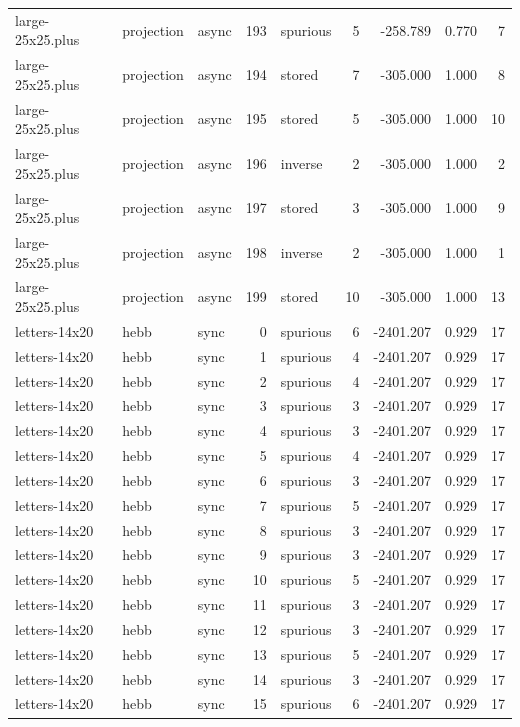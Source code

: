 \begin{tabular}{lllrlrrrr}
large-25x25.plus & projection & async & 193 & spurious & 5 & -258.789 & 0.770 & 7 \\
large-25x25.plus & projection & async & 194 & stored & 7 & -305.000 & 1.000 & 8 \\
large-25x25.plus & projection & async & 195 & stored & 5 & -305.000 & 1.000 & 10 \\
large-25x25.plus & projection & async & 196 & inverse & 2 & -305.000 & 1.000 & 2 \\
large-25x25.plus & projection & async & 197 & stored & 3 & -305.000 & 1.000 & 9 \\
large-25x25.plus & projection & async & 198 & inverse & 2 & -305.000 & 1.000 & 1 \\
large-25x25.plus & projection & async & 199 & stored & 10 & -305.000 & 1.000 & 13 \\
letters-14x20 & hebb & sync & 0 & spurious & 6 & -2401.207 & 0.929 & 17 \\
letters-14x20 & hebb & sync & 1 & spurious & 4 & -2401.207 & 0.929 & 17 \\
letters-14x20 & hebb & sync & 2 & spurious & 4 & -2401.207 & 0.929 & 17 \\
letters-14x20 & hebb & sync & 3 & spurious & 3 & -2401.207 & 0.929 & 17 \\
letters-14x20 & hebb & sync & 4 & spurious & 3 & -2401.207 & 0.929 & 17 \\
letters-14x20 & hebb & sync & 5 & spurious & 4 & -2401.207 & 0.929 & 17 \\
letters-14x20 & hebb & sync & 6 & spurious & 3 & -2401.207 & 0.929 & 17 \\
letters-14x20 & hebb & sync & 7 & spurious & 5 & -2401.207 & 0.929 & 17 \\
letters-14x20 & hebb & sync & 8 & spurious & 3 & -2401.207 & 0.929 & 17 \\
letters-14x20 & hebb & sync & 9 & spurious & 3 & -2401.207 & 0.929 & 17 \\
letters-14x20 & hebb & sync & 10 & spurious & 5 & -2401.207 & 0.929 & 17 \\
letters-14x20 & hebb & sync & 11 & spurious & 3 & -2401.207 & 0.929 & 17 \\
letters-14x20 & hebb & sync & 12 & spurious & 3 & -2401.207 & 0.929 & 17 \\
letters-14x20 & hebb & sync & 13 & spurious & 5 & -2401.207 & 0.929 & 17 \\
letters-14x20 & hebb & sync & 14 & spurious & 3 & -2401.207 & 0.929 & 17 \\
letters-14x20 & hebb & sync & 15 & spurious & 6 & -2401.207 & 0.929 & 17 \\

\end{tabular}
